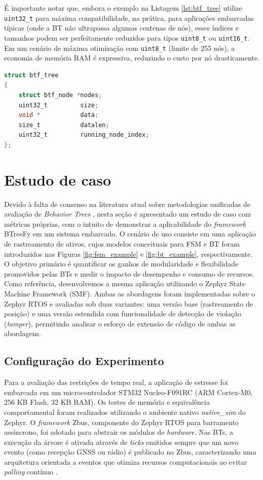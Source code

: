 \documentclass[conference]{IEEEtran}
\begin{document}
É importante notar que, embora o exemplo na Listagem \ref{lst:btf_tree} utilize \texttt{uint32\_t} para máxima compatibilidade, na prática, para aplicações embarcadas típicas (onde a BT não ultrapassa algumas centenas de nós), esses índices e tamanhos podem ser perfeitamente reduzidos para tipos \texttt{uint8\_t} ou \texttt{uint16\_t}. Em um cenário de máxima otimização com \texttt{uint8\_t} (limite de 255 nós), a economia de memória RAM é expressiva, reduzindo o custo por nó drasticamente.

\begin{lstlisting}[language=C, caption={Definição do objeto árvore no \textit{BTreeFy}}, label={lst:btf_tree}]
struct btf_tree
{
    struct btf_node *nodes;
    uint32_t         size;
    void *           data;
    size_t           datalen;
    uint32_t         running_node_index;
};
\end{lstlisting}

 

\section{Estudo de caso}

Devido à falta de consenso na literatura atual sobre metodologias unificadas de avaliação de \textit{Behavior Trees} \cite{gugliermo_evaluating_2024}, nesta seção é apresentado um estudo de caso com métricas próprias, com o intuito de demonstrar a aplicabilidade do \textit{framework} BTreeFy em um sistema embarcado. O cenário de uso consiste em uma aplicação de rastreamento de ativos, cujos modelos conceituais para FSM e BT foram introduzidos nas Figuras \ref{fig:fsm_example} e \ref{fig:bt_example}, respectivamente. O objetivo primário é quantificar os ganhos de modularidade e flexibilidade promovidos pelas BTs e medir o impacto de desempenho e consumo de recursos. Como referência, desenvolvemos a mesma aplicação utilizando o Zephyr State Machine Framework (SMF). Ambas as abordagens foram implementadas sobre o Zephyr RTOS e avaliadas sob duas variantes: uma versão base (rastreamento de posição) e uma versão estendida com funcionalidade de detecção de violação (\textit{tamper}), permitindo analisar o esforço de extensão de código de ambas as abordagens.

\subsection{Configuração do Experimento}
Para a avaliação das restrições de tempo real, a aplicação de estresse foi embarcada em um microcontrolador STM32 Nucleo-F091RC (ARM Cortex-M0, 256 KB Flash, 32 KB RAM). Os testes de memória e equivalência comportamental foram realizados utilizando o ambiente nativo \textit{native\_sim} do Zephyr. O \textit{framework} Zbus, componente do Zephyr RTOS para barramento assíncrono, foi adotado para abstrair os módulos de \textit{hardware}. Nas BTs, a execução da árvore é ativada através de \textit{ticks} emitidos sempre que um novo evento (como recepção GNSS ou rádio) é publicado no Zbus, caracterizando uma arquitetura orientada a eventos que otimiza recursos computacionais ao evitar \textit{polling} contínuo \cite{wu_microsbt_2021}.
\end{document}
